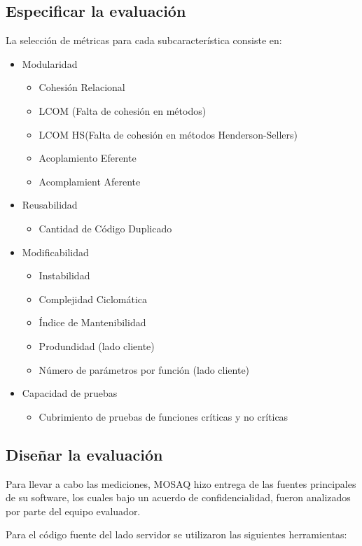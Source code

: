 \documentclass[letterpaper]{article}
\begin{document}
\subsection{Especificar la evaluación}
La selección de métricas para cada subcaracterística consiste en:
\begin{itemize}
\item Modularidad
	\begin{itemize}
		\item Cohesión Relacional
		\item LCOM (Falta de cohesión en métodos)
		\item LCOM HS(Falta de cohesión en métodos Henderson-Sellers)
		\item Acoplamiento Eferente
		\item Acomplamient Aferente
	\end{itemize}
\item Reusabilidad
	\begin{itemize}
		\item Cantidad de Código Duplicado
	\end{itemize}
\item Modificabilidad
	\begin{itemize}
		\item Instabilidad
		\item Complejidad Ciclomática 
		\item Índice de Mantenibilidad
        \item Produndidad (lado cliente)
        \item Número de parámetros por función (lado cliente)
	\end{itemize}
\item Capacidad de pruebas
	\begin{itemize}
		\item Cubrimiento de pruebas de funciones críticas y no críticas
	\end{itemize}
\end{itemize}
\subsection{Diseñar la evaluación}

Para llevar a cabo las mediciones, MOSAQ hizo entrega de las fuentes principales de su software, 
los cuales bajo un acuerdo de confidencialidad, fueron analizados por parte del equipo evaluador.

Para el código fuente del lado servidor se utilizaron las siguientes herramientas:
\end{document}
